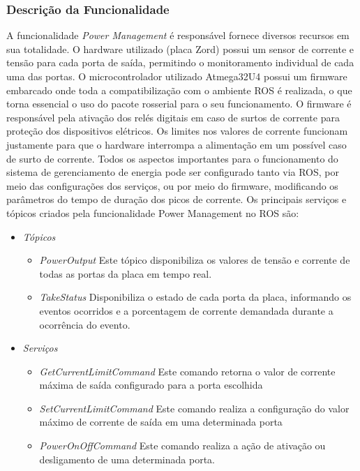 \subsubsection{Descrição da Funcionalidade}
A funcionalidade \textit{Power Management} é responsável  fornece diversos recursos em sua totalidade. O hardware utilizado (placa Zord) possui um sensor de corrente e tensão para cada porta de saída, permitindo o monitoramento individual de cada uma das portas. O microcontrolador utilizado Atmega32U4 possui um firmware embarcado onde toda a compatibilização com o ambiente ROS é realizada, o que torna essencial o uso do pacote rosserial para o seu funcionamento. O firmware é responsável pela ativação dos relés digitais em caso de surtos de corrente para proteção dos dispositivos elétricos. 
Os limites nos valores de corrente funcionam justamente para que o hardware interrompa a alimentação em um possível caso de surto de corrente. Todos os aspectos importantes para o funcionamento do sistema de gerenciamento de energia pode ser configurado tanto via ROS, por meio das configurações dos serviços, ou por meio do firmware, modificando os parâmetros do tempo de duração dos picos de corrente. Os principais serviços e tópicos criados pela funcionalidade Power Management no ROS são:
\begin{itemize}
	\item \textit{Tópicos}
	\begin{itemize}
		\item \textit{PowerOutput}
		Este tópico disponibiliza os valores de tensão e corrente de todas as portas da placa em tempo real.
		\item \textit{TakeStatus}
		Disponibiliza o estado de cada porta da placa, informando os eventos ocorridos e a porcentagem de corrente demandada durante a ocorrência do evento.
	\end{itemize} 
	\item \textit{Serviços} 
	\begin{itemize}
	\item \textit{GetCurrentLimitCommand}
	Este comando retorna o valor de corrente máxima de saída configurado para a porta escolhida
	\item \textit{SetCurrentLimitCommand}
	Este comando realiza a configuração do valor máximo de corrente de saída em uma determinada porta
	\item \textit{PowerOnOffCommand}
	Este comando realiza a ação de ativação ou desligamento de uma determinada porta.
	\end{itemize}
\end{itemize}
